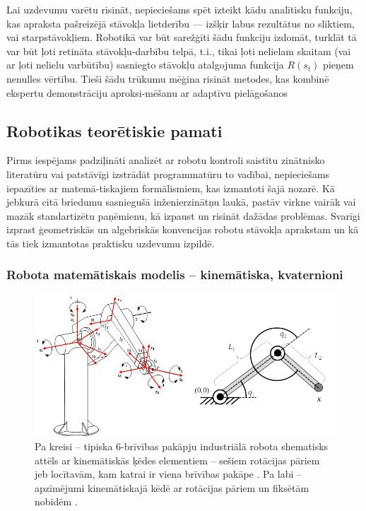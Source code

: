 \documentclass[12pt, a4paper]{article}
\numberwithin{equation}{section} %
\begin{document}
Lai uzdevumu varētu risināt, nepieciešams spēt izteikt kādu analītisku funkciju, kas apraksta pašreizējā stāvokļa lietderību --- izšķir labus rezultātus no sliktiem, vai starpstāvokļiem. Robotikā var būt sarežģīti šādu funkciju izdomāt, turklāt tā var būt ļoti retināta stāvokļu-darbību telpā, t.i., tikai ļoti nelielam skaitam (vai ar ļoti nelielu varbūtību) sasniegto stāvokļu atalgojuma funkcija $R(s_t)$ pieņem nenulles vērtību. Tieši šādu trūkumu mēģina risināt metodes, kas kombinē ekspertu demonstrāciju aproksi-mēšanu ar adaptīvu pielāgošanos \cite{nair2018overcoming}


\subsection{Robotikas teorētiskie pamati}

Pirms iespējams padziļināti analizēt ar robotu kontroli saistītu zinātnisko literatūru vai patstāvīgi izstrādāt programmatūru to vadībai, nepieciešams iepazīties ar matemā-tiskajiem formālismiem, kas izmantoti šajā nozarē. Kā jebkurā citā briedumu sasniegušā inženierzinātņu laukā, pastāv virkne vairāk vai mazāk standartizētu paņēmienu, kā izpaust un risināt dažādas problēmas. Svarīgi izprast ģeometriskās un algebriskās konvencijas robotu stāvokļa aprakstam un kā tās tiek izmantotas praktisku uzdevumu izpildē.

\subsubsection{Robota matemātiskais modelis -- kinemātiska, kvaternioni}


\begin{figure}[t!]
    \centering
    \includegraphics[width=16cm,page=1]{../img/6dof-kinematics.png}
    \caption{Pa kreisi -- tipiska 6-brīvības pakāpju industriālā robota shematisks attēls ar kinemātiskās ķēdes elementiem -- sešiem rotācijas pāriem jeb locītavām, kam katrai ir viena brīvības pakāpe \cite{harib2012parallel}. Pa labi -- apzīmējumi kinemātiskajā kēdē ar rotācijas pāriem un fiksētām nobīdēm \cite{kinematics_illinois}.}
\end{figure}
\end{document}
